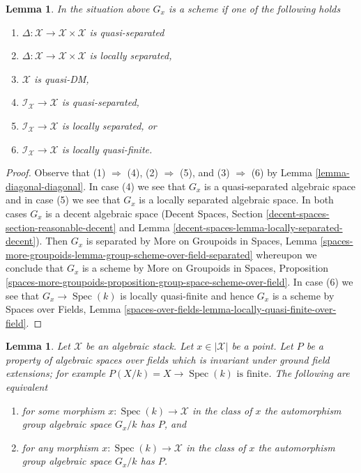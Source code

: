 \documentclass{stacks-project}
\theoremstyle{plain}
\newtheorem{lemma}[subsection]{Lemma}
\theoremstyle{definition}
\theoremstyle{remark}
\numberwithin{equation}{subsection}
\def\Spec{\mathop{\mathrm{Spec}}}
\begin{document}
\begin{lemma}
\label{lemma-automorphism-group-scheme}
In the situation above $G_x$ is a scheme if one of the following
holds
\begin{enumerate}
\item $\Delta : \mathcal{X} \to \mathcal{X} \times \mathcal{X}$
is quasi-separated
\item $\Delta : \mathcal{X} \to \mathcal{X} \times \mathcal{X}$
is locally separated,
\item $\mathcal{X}$ is quasi-DM,
\item $\mathcal{I}_\mathcal{X} \to \mathcal{X}$
is quasi-separated,
\item $\mathcal{I}_\mathcal{X} \to \mathcal{X}$
is locally separated, or
\item $\mathcal{I}_\mathcal{X} \to \mathcal{X}$
is locally quasi-finite.
\end{enumerate}
\end{lemma}

\begin{proof}
Observe that (1) $\Rightarrow$ (4), (2) $\Rightarrow$ (5), and
(3) $\Rightarrow$ (6) by
Lemma \ref{lemma-diagonal-diagonal}.
In case (4) we see that $G_x$ is a quasi-separated
algebraic space and in case (5) we see that $G_x$
is a locally separated algebraic space.
In both cases $G_x$ is a decent algebraic space
(Decent Spaces, Section \ref{decent-spaces-section-reasonable-decent} and
Lemma \ref{decent-spaces-lemma-locally-separated-decent}).
Then $G_x$ is separated by More on Groupoids in Spaces, Lemma
\ref{spaces-more-groupoids-lemma-group-scheme-over-field-separated}
whereupon we conclude that $G_x$ is a scheme by
More on Groupoids in Spaces, Proposition
\ref{spaces-more-groupoids-proposition-group-space-scheme-over-field}.
In case (6) we see that $G_x \to \Spec(k)$ is locally quasi-finite
and hence $G_x$ is a scheme by
Spaces over Fields, Lemma
\ref{spaces-over-fields-lemma-locally-quasi-finite-over-field}.
\end{proof}

\begin{lemma}
\label{lemma-property-automorphism-groups}
Let $\mathcal{X}$ be an algebraic stack. Let $x \in |\mathcal{X}|$ be a point.
Let $P$ be a property of algebraic spaces over fields which is invariant
under ground field extensions; for example
$P(X/k) = X \to \Spec(k)\text{ is finite}$.
The following are equivalent
\begin{enumerate}
\item for some morphism $x : \Spec(k) \to \mathcal{X}$ in the
class of $x$ the automorphism group algebraic space $G_x/k$
has $P$, and
\item for any morphism $x : \Spec(k) \to \mathcal{X}$ in the
class of $x$ the automorphism group algebraic space $G_x/k$
has $P$.
\end{enumerate}
\end{lemma}
\end{document}
